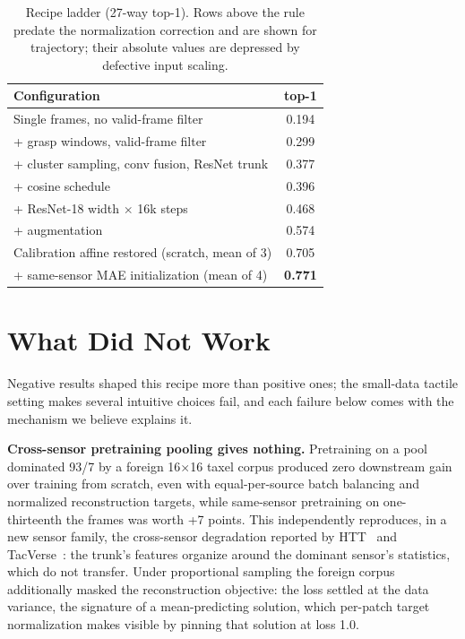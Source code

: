 \documentclass[conference]{IEEEtran}
\begin{document}
\begin{table}[h]
\centering
\caption{Recipe ladder (27-way top-1). Rows above the rule predate the normalization
correction and are shown for trajectory; their absolute values are depressed by defective
input scaling.}
\label{tab:ladder}
\begin{tabular}{lc}
\toprule
Configuration & top-1 \\
\midrule
Single frames, no valid-frame filter & 0.194 \\
+ grasp windows, valid-frame filter & 0.299 \\
+ cluster sampling, conv fusion, ResNet trunk & 0.377 \\
+ cosine schedule & 0.396 \\
+ ResNet-18 width $\times$ 16k steps & 0.468 \\
+ augmentation & 0.574 \\
\midrule
Calibration affine restored (scratch, mean of 3) & 0.705 \\
+ same-sensor MAE initialization (mean of 4) & \textbf{0.771} \\
\bottomrule
\end{tabular}
\end{table}

\section{What Did Not Work}
\label{sec:negative}
Negative results shaped this recipe more than positive ones; the small-data tactile
setting makes several intuitive choices fail, and each failure below comes with the
mechanism we believe explains it.

\textbf{Cross-sensor pretraining pooling gives nothing.} Pretraining on a pool dominated
93/7 by a foreign 16$\times$16 taxel corpus produced zero downstream gain over training
from scratch, even with equal-per-source batch balancing and normalized reconstruction
targets, while same-sensor pretraining on one-thirteenth the frames was worth +7 points.
This independently reproduces, in a new sensor family, the cross-sensor degradation
reported by HTT~\cite{bi2026htt} and TacVerse~\cite{wei2026tacverse}: the trunk's features
organize around the dominant sensor's statistics, which do not transfer. Under proportional
sampling the foreign corpus additionally masked the reconstruction objective: the loss
settled at the data variance, the signature of a mean-predicting solution, which
per-patch target normalization makes visible by pinning that solution at loss 1.0.
\end{document}
